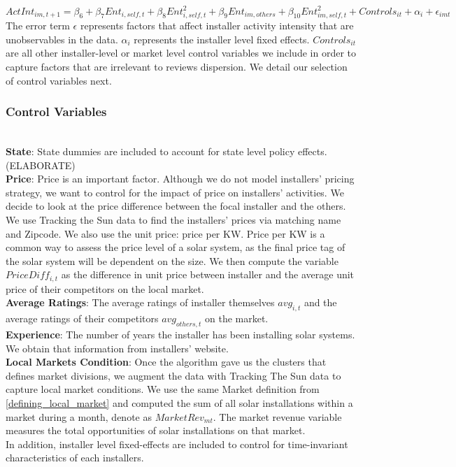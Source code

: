 \documentclass[msom,blindrev]{informs3}
\begin{document}
\begin{equation}
    ActInt_{im,t+1}=\beta_{6}+\beta_{7}Ent_{i,self,t}+\beta_{8}Ent_{i,self,t}^2+\beta_{9}Ent_{im,others}+\beta_{10}Ent_{im,self,t}^2+Controls_{it}+\alpha_{i}+\epsilon_{imt}
   \label{model_ind_3}
\end{equation}
 The error term $\epsilon$ represents factors that affect installer activity intensity that are unobservables in the data. $\alpha_{i}$ represents the installer level fixed effects. $Controls_{it}$ are all other installer-level or market level control variables we include in order to capture factors that are irrelevant to reviews dispersion. We detail our selection of control variables next.
\subsubsection{Control Variables}\hfill\\
\textbf{State}: State dummies are included to account for state level policy effects. (ELABORATE)\\
\textbf{Price}: Price is an important factor. Although we do not model installers' pricing strategy, we want to control for the impact of price on installers' activities. We decide to look at the price difference between the focal installer and the others. We use Tracking the Sun data to find the installers' prices via matching name and Zipcode. We also use the unit price: price per KW. Price per KW is a common way to assess the price level of a solar system, as the final price tag of the solar system will be dependent on the size. We then compute the variable $PriceDiff_{i,t}$ as the difference in unit price between installer and the average unit price of their competitors on the local market. \\
\textbf{Average Ratings}: The average ratings of installer themselves $avg_{i,t}$ and the average ratings of their competitors $avg_{others,t}$ on the market. \\
\textbf{Experience}: The number of years the installer has been installing solar systems. We obtain that information from installers' website. \\
\textbf{Local Markets Condition}: Once the algorithm gave us the clusters that defines market divisions, we augment the data with Tracking The Sun data to capture local market conditions. We use the same Market definition from \ref{defining_local_market} and computed the sum of all solar installations within a market during a month, denote as $MarketRev_{mt}$. The market revenue variable measures the total opportunities of solar installations on that market. \\
In addition, installer level fixed-effects are included to control for time-invariant characteristics of each installers.
\end{document}

